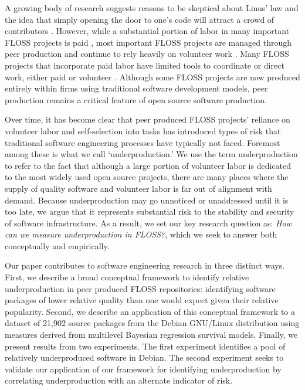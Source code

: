\documentclass[10pt,conference]{IEEEtran}\usepackage[]{graphicx}\usepackage[usenames,dvipsnames]{color}
\begin{document}
A growing body of research suggests reasons to be skeptical about Linus' law \cite{schweik_brooks_2008} and the idea that simply opening the door to one's code will attract a crowd of contributors \cite{schweik_internet_2012, benkler_peer_2015}. However, while a substantial portion of labor in many important FLOSS projects is paid \cite{germonprez_rising_2019}, most important FLOSS projects are managed through peer production and continue to rely heavily on volunteer work \cite{eghbal_working_2020}. Many FLOSS projects that incorporate paid labor have limited tools to coordinate or direct work, either paid or volunteer \cite{eghbal_working_2020}. Although some FLOSS projects are now produced entirely within firms using traditional software development models, peer production remains a critical feature of open source software production.

Over time, it has become clear that peer produced FLOSS projects' reliance on volunteer labor and self-selection into tasks has introduced types of risk that traditional software engineering processes have typically not faced. Foremost among these is what we call `underproduction.' We use the term underproduction to refer to the fact that although a large portion of volunteer labor is dedicated to the most widely used open source projects, there are many places where the supply of quality software and volunteer labor is far out of alignment with demand. 
Because underproduction may go unnoticed or unaddressed until it is too late,
we argue that it represents substantial risk to the stability and security of software infrastructure. As a result, we set our key research question as: 
\textit{How can we measure underproduction in FLOSS?}, which we seek to answer both conceptually and empirically. %

Our paper contributes to software engineering research in three distinct ways. First, we describe a broad conceptual framework to identify relative underproduction in peer produced FLOSS repositories: identifying software packages of lower relative quality than one would expect given their relative popularity. Second, we describe an application of this conceptual framework to a dataset of 21,902 source packages from the Debian GNU/Linux distribution using measures derived from multilevel Bayesian regression survival models.
Finally, we present results from two experiments. The first experiment identifies a pool of relatively underproduced software in Debian. The second experiment seeks to validate our application of our framework for identifying underproduction by correlating underproduction with an alternate indicator of risk.
\end{document}
